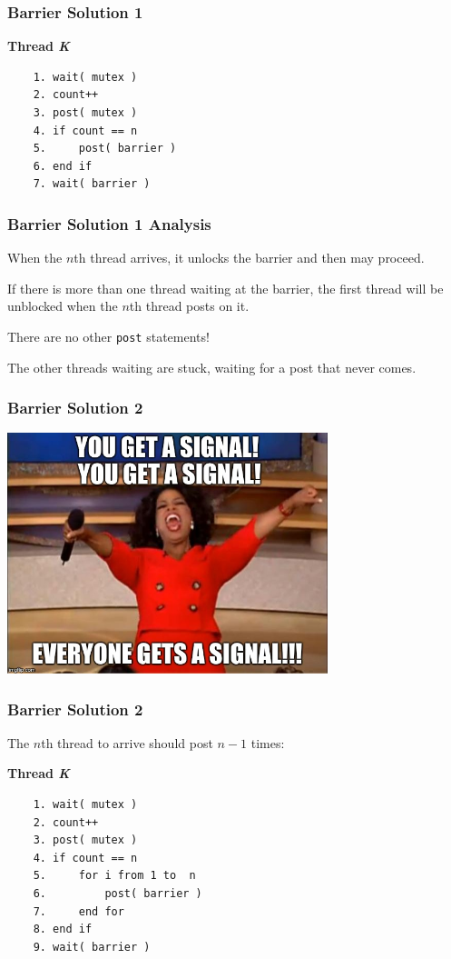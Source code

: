 \begin{frame}[fragile]
	\frametitle{Barrier Solution 1}

	\textbf{Thread \textit{K}}\vspace{-10em}
	\begin{verbatim}
	1. wait( mutex )
	2. count++
	3. post( mutex )
	4. if count == n
	5.     post( barrier )
	6. end if
	7. wait( barrier )
  \end{verbatim}
	\vspace{-2em}


\end{frame}

\begin{frame}
	\frametitle{Barrier Solution 1 Analysis}

	When the $n$th thread arrives, it unlocks the barrier and then may proceed.

	If there is more than one thread waiting at the barrier, the first thread will be unblocked when the $n$th thread posts on it.

	There are no other \texttt{post} statements!

	The other threads waiting are stuck, waiting for a post that never comes.


\end{frame}


\begin{frame}
	\frametitle{Barrier Solution 2}

	\begin{center}
		\includegraphics[width=0.7\textwidth]{images/oprah.jpg}
	\end{center}


\end{frame}


\begin{frame}[fragile]
	\frametitle{Barrier Solution 2}

	The $n$th thread to arrive should post $n-1$ times:

	\textbf{Thread \textit{K}}\vspace{-6em}
	\begin{verbatim}
	1. wait( mutex )
	2. count++
	3. post( mutex )
	4. if count == n
	5.     for i from 1 to  n
	6.         post( barrier )
	7.     end for
	8. end if
	9. wait( barrier )
  \end{verbatim}
	\vspace{-2em}




\end{frame}


